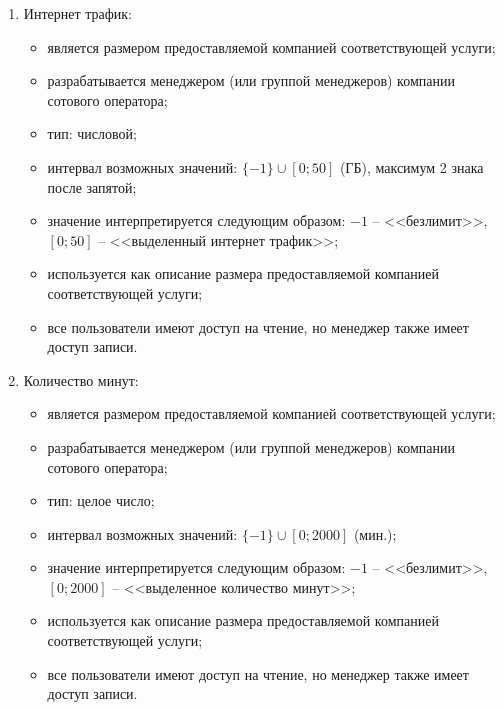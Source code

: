 \begin{enumerate}
\begin{enumerate}
        \item Интернет трафик:
        \begin{itemize}
            \item является размером предоставляемой компанией соответствующей услуги;
            \item разрабатывается менеджером (или группой менеджеров) компании сотового оператора;
            \item тип: числовой;
            \item интервал возможных значений: $\{-1\} \cup [0; 50]$ (ГБ), максимум 2 знака после запятой; %
            \item значение интерпретируется следующим образом: $-1$ -- <<безлимит>>, $[0; 50]$ -- <<выделенный интернет трафик>>;
            \item используется как описание размера предоставляемой компанией соответствующей услуги;
            \item все пользователи имеют доступ на чтение, но менеджер также имеет доступ записи.
        \end{itemize}

        \item Количество минут:
        \begin{itemize}
            \item является размером предоставляемой компанией соответствующей услуги;
            \item разрабатывается менеджером (или группой менеджеров) компании сотового оператора;
            \item тип: целое число;
            \item интервал возможных значений: $\{-1\} \cup [0; 2 000]$ (мин.); %
            \item значение интерпретируется следующим образом: $-1$ -- <<безлимит>>, $[0; 2 000]$ -- <<выделенное количество минут>>;
            \item используется как описание размера предоставляемой компанией соответствующей услуги;
            \item все пользователи имеют доступ на чтение, но менеджер также имеет доступ записи.
        \end{itemize}


\end{enumerate}
\end{enumerate}
